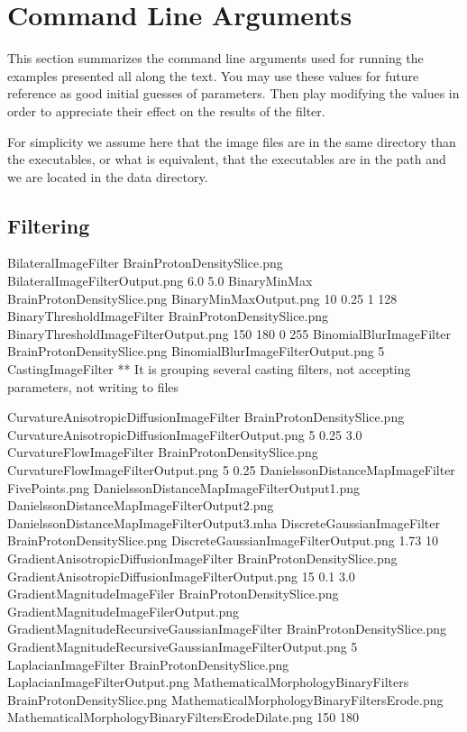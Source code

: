 \section{Command Line Arguments}

This section summarizes the command line arguments used for running the
examples presented all along the text. You may use these values for future
reference as good initial guesses of parameters. Then play modifying the values
in order to appreciate their effect on the results of the filter.

For simplicity we assume here that the image files are in the same directory
than the executables, or what is equivalent, that the executables are in the
path and we are located in the data directory.

\subsection{Filtering}

BilateralImageFilter             BrainProtonDensitySlice.png  BilateralImageFilterOutput.png        6.0    5.0
BinaryMinMax                     BrainProtonDensitySlice.png  BinaryMinMaxOutput.png                10      0.25  1  128
BinaryThresholdImageFilter       BrainProtonDensitySlice.png  BinaryThresholdImageFilterOutput.png  150 180 0 255
BinomialBlurImageFilter          BrainProtonDensitySlice.png  BinomialBlurImageFilterOutput.png     5
CastingImageFilter               ** It is grouping several casting filters, not accepting parameters, not writing to files

CurvatureAnisotropicDiffusionImageFilter  BrainProtonDensitySlice.png  CurvatureAnisotropicDiffusionImageFilterOutput.png  5  0.25  3.0
CurvatureFlowImageFilter         BrainProtonDensitySlice.png  CurvatureFlowImageFilterOutput.png   5  0.25
DanielssonDistanceMapImageFilter FivePoints.png DanielssonDistanceMapImageFilterOutput1.png DanielssonDistanceMapImageFilterOutput2.png DanielssonDistanceMapImageFilterOutput3.mha
DiscreteGaussianImageFilter      BrainProtonDensitySlice.png  DiscreteGaussianImageFilterOutput.png  1.73  10
GradientAnisotropicDiffusionImageFilter  BrainProtonDensitySlice.png GradientAnisotropicDiffusionImageFilterOutput.png   15    0.1   3.0
GradientMagnitudeImageFiler      BrainProtonDensitySlice.png  GradientMagnitudeImageFilerOutput.png
GradientMagnitudeRecursiveGaussianImageFilter  BrainProtonDensitySlice.png GradientMagnitudeRecursiveGaussianImageFilterOutput.png  5
LaplacianImageFilter             BrainProtonDensitySlice.png  LaplacianImageFilterOutput.png
MathematicalMorphologyBinaryFilters BrainProtonDensitySlice.png MathematicalMorphologyBinaryFiltersErode.png MathematicalMorphologyBinaryFiltersErodeDilate.png 150 180


